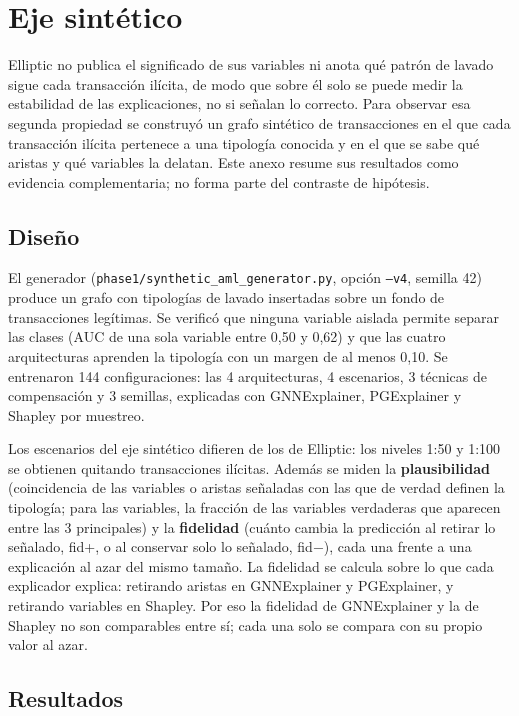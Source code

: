 \chapter{Eje sintético}\label{anx:sintetico}

Elliptic no publica el significado de sus variables ni anota qué patrón de lavado sigue cada
transacción ilícita, de modo que sobre él solo se puede medir la estabilidad de las
explicaciones, no si señalan lo correcto. Para observar esa segunda propiedad se construyó un
grafo sintético de transacciones en el que cada transacción ilícita pertenece a una tipología
conocida y en el que se sabe qué aristas y qué variables la delatan. Este anexo resume sus
resultados como evidencia complementaria; no forma parte del contraste de hipótesis.

\section{Diseño}

El generador (\texttt{phase1/synthetic\_aml\_generator.py}, opción \texttt{--v4}, semilla 42)
produce un grafo con tipologías de lavado insertadas sobre un fondo de transacciones
legítimas. Se verificó que ninguna variable aislada permite separar las clases (AUC de una
sola variable entre 0,50 y 0,62) y que las cuatro arquitecturas aprenden la tipología con un
margen de al menos 0,10. Se entrenaron 144 configuraciones: las 4 arquitecturas, 4 escenarios,
3 técnicas de compensación y 3 semillas, explicadas con GNNExplainer, PGExplainer y Shapley
por muestreo.

Los escenarios del eje sintético difieren de los de Elliptic: los niveles 1:50 y 1:100 se
obtienen quitando transacciones ilícitas. Además se miden la \textbf{plausibilidad}
(coincidencia de las variables o aristas señaladas con las que de verdad definen la
tipología; para las variables, la fracción de las variables verdaderas que aparecen entre las 3
principales) y la \textbf{fidelidad} (cuánto cambia la predicción al retirar lo señalado, fid+,
o al conservar solo lo señalado, fid$-$), cada una frente a una explicación al azar del mismo
tamaño. La fidelidad se calcula sobre lo que cada explicador explica: retirando aristas en
GNNExplainer y PGExplainer, y retirando variables en Shapley. Por eso la fidelidad de
GNNExplainer y la de Shapley no son comparables entre sí; cada una solo se compara con su propio
valor al azar.

\section{Resultados}


